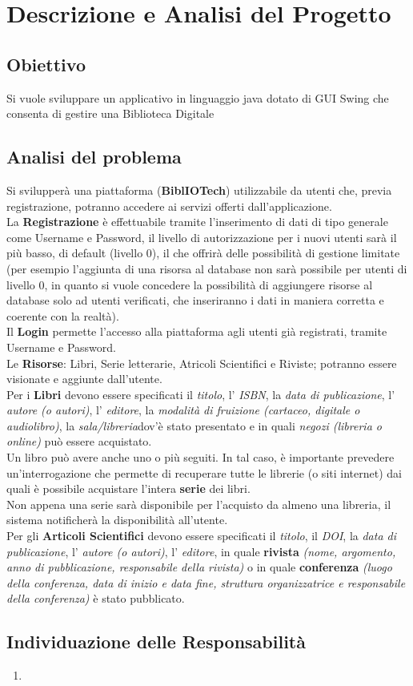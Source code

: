 \chapter{Descrizione e Analisi del Progetto}
\section{Obiettivo}
Si vuole sviluppare un applicativo in linguaggio java dotato di GUI Swing che consenta di gestire una Biblioteca Digitale
\section{Analisi del problema}
Si svilupperà una piattaforma (\textbf{BiblIOTech}) utilizzabile da utenti che, previa registrazione, potranno accedere ai servizi offerti dall'applicazione.
\\ \indent La \textbf{Registrazione} è effettuabile tramite l'inserimento di dati di tipo generale come Username e Password, il livello di autorizzazione per i nuovi utenti sarà il più basso, di default (livello 0), il che offrirà delle possibilità di gestione limitate (per esempio l'aggiunta di una risorsa al database non sarà possibile per utenti di livello 0, in quanto si vuole concedere la possibilità di aggiungere risorse al database solo ad utenti verificati, che inseriranno i dati in maniera corretta e coerente con la realtà).
\\ \indent Il \textbf{Login} permette l'accesso alla piattaforma agli utenti già registrati, tramite Username e Password.
\\ \indent Le \textbf{Risorse}: Libri, Serie letterarie, Atricoli Scientifici e Riviste; potranno essere visionate e aggiunte dall'utente.
\\ \indent Per i \textbf{Libri} devono essere specificati il \emph{titolo}, l' \emph{ISBN}, la \emph{data di publicazione}, l' \emph{autore (o autori)}, l' \emph{editore}, la \emph{modalità di fruizione (cartaceo, digitale o audiolibro)}, la \emph{sala/libreria}dov'è stato presentato e in quali \emph{negozi (libreria o online)} può essere acquistato.\\ Un libro può avere anche uno o più seguiti. In tal caso, è importante prevedere un’interrogazione che permette di recuperare tutte le librerie (o siti internet) dai quali è possibile acquistare l’intera \textbf{serie} dei libri.\\ Non appena una serie sarà disponibile per l’acquisto da almeno una libreria, il sistema notificherà la disponibilità all’utente.
\\ \indent Per gli \textbf{Articoli Scientifici} devono essere specificati il \emph{titolo}, il \emph{DOI}, la \emph{data di publicazione}, l' \emph{autore (o autori)}, l' \emph{editore}, in quale \textbf{rivista} \emph{(nome, argomento, anno di pubblicazione, responsabile della rivista)} o in quale \textbf{conferenza} \emph{(luogo della conferenza, data di inizio e data fine, struttura organizzatrice e responsabile della conferenza)} è stato pubblicato.
\section{Individuazione delle Responsabilità}
\begin{enumerate}
    \item 
\end{enumerate}